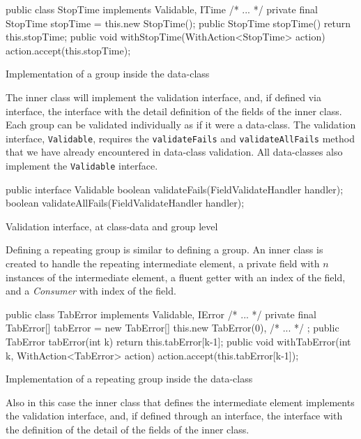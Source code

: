 \documentclass[a4paper,10pt]{report}
\newenvironment{elisting}[1][H]
  {\captionsetup{aboveskip=0pt}\begin{listing}[#1]}
  {\end{listing}%
}
\begin{document}
\begin{elisting}[!htb]
\begin{javacode}
    public class StopTime implements Validable, ITime {/* ... */}
    private final StopTime stopTime = this.new StopTime();
    public StopTime stopTime() { return this.stopTime; }
    public void withStopTime(WithAction<StopTime> action) { action.accept(this.stopTime); }
\end{javacode}
\caption{Implementation of a group inside the data-class}
\label{lst:grp.indef}
\end{elisting}

The inner class will implement the validation interface, and, if defined via 
interface, the interface with the detail definition of the fields of the inner 
class. Each group can be validated individually as if it were a data-class.
The validation interface, \texttt{Validable}, requires the 
\texttt{validateFails} and \texttt{validateAllFails} method that we have already 
encountered in data-class validation. 
All data-classes also implement the \texttt{Validable} interface.

\begin{elisting}[!htb]
\begin{javacode}
public interface Validable {
    boolean validateFails(FieldValidateHandler handler);
    boolean validateAllFails(FieldValidateHandler handler);
}
\end{javacode}
\caption{Validation interface, at class-data and group level}
\label{lst:if.validable}
\end{elisting}

Defining a repeating group is similar to defining a group. An inner class is 
created to handle the repeating intermediate element, a private field with $n$ 
instances of the intermediate element, a fluent getter with an index of the 
field, and a \textit{Consumer} with index of the field.

\begin{elisting}[!htb]
\begin{javacode}
    public class TabError implements Validable, IError {/* ... */}
    private final TabError[] tabError = new TabError[] {
        this.new TabError(0),
        /* ... */
    };
    public TabError tabError(int k) { return this.tabError[k-1]; }
    public void withTabError(int k, WithAction<TabError> action) { action.accept(this.tabError[k-1]); }
\end{javacode}
\caption{Implementation of a repeating group inside the data-class}
\label{lst:occ.indef}
\end{elisting}

Also in this case the inner class that defines the intermediate element 
implements the validation interface, and, if defined through an interface, the 
interface with the definition of the detail of the fields of the inner class.


\clearpage
\listoffigures
\listoftables
\listoflistings
\printindex
\end{document}
